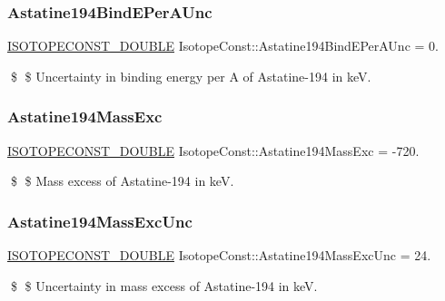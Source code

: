 \subsubsection{\texorpdfstring{Astatine194\+Bind\+E\+Per\+A\+Unc}{Astatine194BindEPerAUnc}}
{\footnotesize\ttfamily \mbox{\hyperlink{group___isotope_const-_macros_ga8f45a7272ce02c0b4c65c44636ed719a}{I\+S\+O\+T\+O\+P\+E\+C\+O\+N\+S\+T\+\_\+\+D\+O\+U\+B\+LE}} Isotope\+Const\+::\+Astatine194\+Bind\+E\+Per\+A\+Unc = 0.}

\$ \$ Uncertainty in binding energy per A of Astatine-\/194 in keV. \mbox{\label{group___isotope_const-_astatine-_at194_ga07e8f6492b30e92938248873e24a6b30}} 
\subsubsection{\texorpdfstring{Astatine194\+Mass\+Exc}{Astatine194MassExc}}
{\footnotesize\ttfamily \mbox{\hyperlink{group___isotope_const-_macros_ga8f45a7272ce02c0b4c65c44636ed719a}{I\+S\+O\+T\+O\+P\+E\+C\+O\+N\+S\+T\+\_\+\+D\+O\+U\+B\+LE}} Isotope\+Const\+::\+Astatine194\+Mass\+Exc = -\/720.}

\$ \$ Mass excess of Astatine-\/194 in keV. \mbox{\label{group___isotope_const-_astatine-_at194_ga4c3ebb5baf5d3c5bc0c0ffe1d40ed1fe}} 
\subsubsection{\texorpdfstring{Astatine194\+Mass\+Exc\+Unc}{Astatine194MassExcUnc}}
{\footnotesize\ttfamily \mbox{\hyperlink{group___isotope_const-_macros_ga8f45a7272ce02c0b4c65c44636ed719a}{I\+S\+O\+T\+O\+P\+E\+C\+O\+N\+S\+T\+\_\+\+D\+O\+U\+B\+LE}} Isotope\+Const\+::\+Astatine194\+Mass\+Exc\+Unc = 24.}

\$ \$ Uncertainty in mass excess of Astatine-\/194 in keV. \mbox{\label{group___isotope_const-_astatine-_at194_gadd07bc461abf4e080521405602d0ff1b}} 
